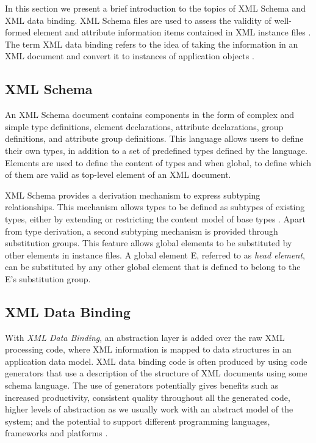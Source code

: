 \documentclass{sig-alternate}
\begin{document}
In this section we present a brief introduction to the topics of XML Schema and XML data binding. XML Schema files are used to assess the validity of well-formed element and attribute information items contained in XML instance files \cite{w3c:schemas1}\cite{w3c:schemas2}. The term XML data binding refers to the idea of taking the information in an XML document and convert it to instances of application objects \cite{book:mclaughlin}.

\subsection{XML Schema}

An XML Schema document contains components in the form of complex and simple type definitions, element declarations, attribute declarations, group definitions, and attribute group definitions. This language allows users to define their own types, in addition to a set of predefined types defined by the language. Elements are used to define the content of types and when global, to define which of them are valid as top-level element of an XML document.

XML Schema provides a derivation mechanism to express subtyping relationships. This mechanism allows types to be defined as subtypes of existing types, either by extending or restricting the content model of base types . Apart from type derivation, a second subtyping mechanism is provided through substitution groups. This feature allows global elements to be substituted by other elements in instance files. A global element E, referred to as \textit{head element}, can be substituted by any other global element that is defined to belong to the E's substitution group.

\subsection{XML Data Binding}

With \textit{XML Data Binding}, an abstraction layer is added over the raw XML processing code, where XML information is mapped to data structures in an application data model. XML data binding code is often produced by using code generators that use a description of the structure of XML documents using some schema language. The use of generators potentially gives benefits such as increased productivity, consistent quality throughout all the generated code, higher levels of abstraction as we usually work with an abstract model of the system; and the potential to support different programming languages, frameworks and platforms \cite{book:herrington}. 
\end{document}
